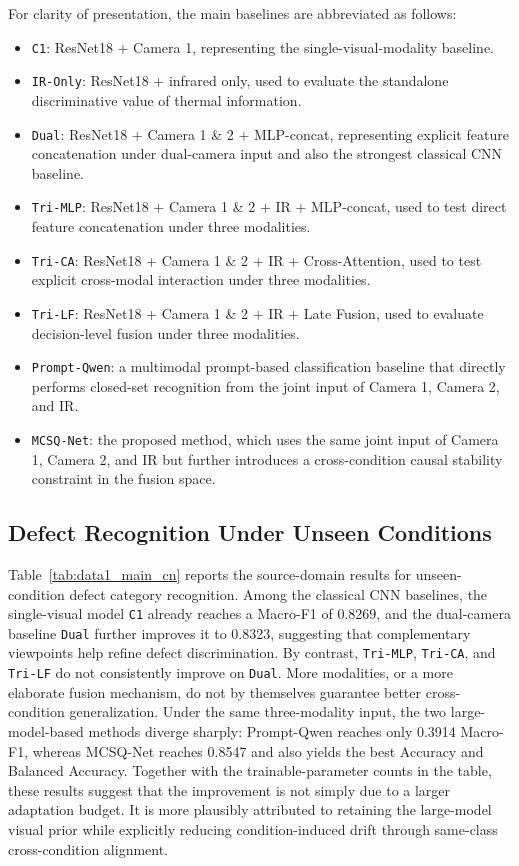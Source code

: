 \documentclass[journal]{IEEEtran}
\begin{document}
For clarity of presentation, the main baselines are abbreviated as follows:
\begin{itemize}
\item \texttt{C1}: ResNet18 + Camera 1, representing the single-visual-modality baseline.
\item \texttt{IR-Only}: ResNet18 + infrared only, used to evaluate the standalone discriminative value of thermal information.
\item \texttt{Dual}: ResNet18 + Camera 1 \& 2 + MLP-concat, representing explicit feature concatenation under dual-camera input and also the strongest classical CNN baseline.
\item \texttt{Tri-MLP}: ResNet18 + Camera 1 \& 2 + IR + MLP-concat, used to test direct feature concatenation under three modalities.
\item \texttt{Tri-CA}: ResNet18 + Camera 1 \& 2 + IR + Cross-Attention, used to test explicit cross-modal interaction under three modalities.
\item \texttt{Tri-LF}: ResNet18 + Camera 1 \& 2 + IR + Late Fusion, used to evaluate decision-level fusion under three modalities.
\item \texttt{Prompt-Qwen}: a multimodal prompt-based classification baseline that directly performs closed-set recognition from the joint input of Camera 1, Camera 2, and IR.
\item \texttt{MCSQ-Net}: the proposed method, which uses the same joint input of Camera 1, Camera 2, and IR but further introduces a cross-condition causal stability constraint in the fusion space.
\end{itemize}

\subsection{Defect Recognition Under Unseen Conditions}

Table~\ref{tab:data1_main_cn} reports the source-domain results for unseen-condition defect category recognition. Among the classical CNN baselines, the single-visual model \texttt{C1} already reaches a Macro-F1 of 0.8269, and the dual-camera baseline \texttt{Dual} further improves it to 0.8323, suggesting that complementary viewpoints help refine defect discrimination. By contrast, \texttt{Tri-MLP}, \texttt{Tri-CA}, and \texttt{Tri-LF} do not consistently improve on \texttt{Dual}. More modalities, or a more elaborate fusion mechanism, do not by themselves guarantee better cross-condition generalization. Under the same three-modality input, the two large-model-based methods diverge sharply: Prompt-Qwen reaches only 0.3914 Macro-F1, whereas MCSQ-Net reaches 0.8547 and also yields the best Accuracy and Balanced Accuracy. Together with the trainable-parameter counts in the table, these results suggest that the improvement is not simply due to a larger adaptation budget. It is more plausibly attributed to retaining the large-model visual prior while explicitly reducing condition-induced drift through same-class cross-condition alignment.
\end{document}
